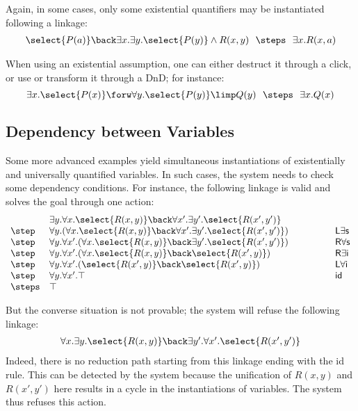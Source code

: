 Again, in some cases, only some existential quantifiers may be
instantiated following a linkage:
$$
\begin{array}{rcl}
\select{P(a)}\back \exists x.\exists y. \select{P(y)}\land R(x,y)
 ~\/~\steps
~\/~
    \exists x. R(x,a)
\end{array}
$$

When using an existential assumption, one can either destruct it
through a click, or use or transform it through a DnD; for instance:
$$
\exists x.\select{P(x)}\forw \forall y.\select{P(y)}\limp
Q(y)  ~\/~\steps
~\/~\exists x.Q(x)
$$

\subsection{Dependency between Variables}
Some more advanced examples yield simultaneous instantiations of
existentially and universally quantified variables. In such cases, the
system needs to check some dependency conditions. For instance, the
following linkage is valid and solves the goal through one action:
$$
\begin{array}{lll}
  &\exists y. \forall x. \select{R(x,y)}\back \forall x'.\exists
    y'. \select{R(x',y')}& \\
  \step& \forall y.(\forall x. \select{R(x,y)}\back \forall x'.\exists
        y'. \select{R(x',y')} ) \mbox{\hbox to 12pt{\hfill}}& \mathsf{L}\exists\mathsf{s}\\
  \step &\forall y. \forall x'. (\forall x. \select{R(x,y)}\back \exists
  y'. \select{R(x',y')} ) ~~~~~~~~~~~~&\mathsf{R}\forall\mathsf{s}\\
  \step &  \forall y. \forall x'. (\forall
         x. \select{R(x,y)}\back\select{R(x',y)} )&\mathsf{R}\exists\mathsf{i}\\
  \step&   \forall y. \forall
           x'. (\select{R(x',y)}\back\select{R(x',y)} )&\mathsf{L}\forall\mathsf{i}\\
   \step  &  \forall y. \forall
           x'. \top & \mathsf{id}\\
\steps& \top
\end{array}
$$

But the converse situation is not provable; the system will refuse
the following linkage:
$$
\begin{array}{rcl}
  \forall x. \exists y. \select{R(x,y)}\back \exists y'.\forall x'. \select{R(x',y')}
\end{array}
$$
Indeed, there is no reduction path starting from this linkage ending with the
\textsf{id} rule. This can be detected by the system because the unification of
$R(x,y)$ and $R(x',y')$ here results in a cycle in the instantiations of
variables. The system thus refuses this action.

